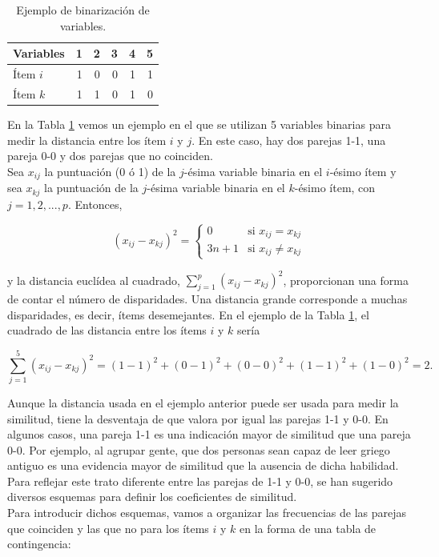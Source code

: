 \documentclass[a4paper, 20pt]{article}
\begin{document}
\begin{table}[H]
  \caption{Ejemplo de binarización de variables.}
  \label{tab:binarizacion}
\centering
  \begin{tabular}{lrrrrr}
    \toprule
  Variables    & 1    & 2    & 3   & 4   & 5   \\
  \midrule
Ítem $i$ & 1    & 0    & 0   & 1   & 1   \\
Ítem $k$ & 1    & 1    & 0   & 1   & 0\\
\bottomrule
\end{tabular}
\end{table}

En la Tabla \ref{tab:binarizacion} vemos un ejemplo en el que se utilizan 5 variables binarias para medir la distancia entre los ítem $i$ y $j$. En este caso, hay dos parejas 1-1, una pareja 0-0 y dos parejas que no coinciden.\\

Sea $x_{ij}$ la puntuación (0 ó 1) de la $j$-ésima variable binaria en el $i$-ésimo ítem y sea $x_{kj}$ la puntuación de la $j$-ésima variable binaria en el $k$-ésimo ítem, con $j=1,2,...,p$. Entonces,

$$(x_{ij}-x_{kj})^2 = \left \{ \begin{matrix} 0 & \mbox{si } x_{ij}=x_{kj}
\\ 3n+1 & \mbox{si }x_{ij}\neq x_{kj}\end{matrix}\right.   $$

y la distancia euclídea al cuadrado, $\sum_{j=1}^p{(x_{ij}-x_{kj})^2}$, proporcionan una forma de contar el número de disparidades. Una distancia grande corresponde a muchas disparidades, es decir, ítems desemejantes. En el ejemplo de la Tabla \ref{tab:binarizacion}, el cuadrado de las distancia entre los ítems $i$ y $k$ sería

$$\sum_{j=1}^5{(x_{ij}-x_{kj})^2}=(1-1)^2+(0-1)^2+(0-0)^2+(1-1)^2+(1-0)^2=2.$$

Aunque la distancia usada en el ejemplo anterior puede ser usada para medir la similitud, tiene la desventaja de que valora por igual las parejas 1-1 y 0-0. En algunos casos, una pareja 1-1 es una indicación mayor de similitud que una pareja 0-0. Por ejemplo, al agrupar gente, que dos personas sean capaz de leer griego antiguo es una evidencia mayor de similitud que la ausencia de dicha habilidad. Para reflejar este trato diferente entre las parejas de 1-1 y 0-0, se han sugerido diversos esquemas para definir los coeficientes de similitud.\\
Para introducir dichos esquemas, vamos a organizar las frecuencias de las parejas que coinciden y las que no para los ítems $i$ y $k$ en la forma de una tabla de contingencia:
\end{document}
